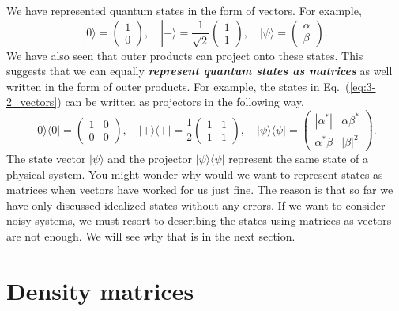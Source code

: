 We have represented quantum states in the form of vectors.
For example,
\begin{equation}
    |0\rangle = \begin{pmatrix} 1 \\ 0 \end{pmatrix}, \quad |+\rangle = \frac{1}{\sqrt{2}} \begin{pmatrix} 1 \\ 1 \end{pmatrix}, \quad |\psi\rangle = \begin{pmatrix} \alpha \\ \beta \end{pmatrix}.
    \label{eq:3-2_vectors}
\end{equation}
We have also seen that outer products can project onto these states.
This suggests that we can equally \textit{\textbf{represent quantum states as matrices}} as well written in the form of outer products.
For example, the states in Eq.~(\ref{eq:3-2_vectors}) can be written as projectors in the following way,
\begin{equation}
    |0\rangle\langle0| = \begin{pmatrix} 1 & 0 \\ 0 & 0 \end{pmatrix}, \quad |+\rangle\langle+| = \frac{1}{2} \begin{pmatrix} 1 & 1 \\ 1 & 1 \end{pmatrix}, \quad |\psi\rangle\langle\psi| = \begin{pmatrix} |\alpha^*| & \alpha\beta^* \\ \alpha^*\beta & |\beta|^2 \end{pmatrix}.
\end{equation}
The state vector $|\psi\rangle$ and the projector $|\psi\rangle\langle\psi|$ represent the same state of a physical system.
You might wonder why would we want to represent states as matrices when vectors have worked for us just fine.
The reason is that so far we have only discussed idealized states without any errors.
If we want to consider noisy systems, we must resort to describing the states using matrices as vectors are not enough.
We will see why that is in the next section.



\section{Density matrices}
\label{sec:3-3_density_matrices}

